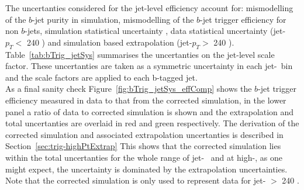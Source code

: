 The uncertanties considered for the jet-level efficiency account for:
mismodelling of the $b$-jet purity in simulation, mismodelling of the $b$-jet trigger efficiency for non $b$-jets,
simulation statistical uncertainty , data statistical uncertainty (jet-$p_T <$ 240 \GeV) and simulation based extrapolation (jet-$p_T >$ 240 \GeV).
Table~\ref{tab:bTrig_jetSys} summarises the uncertanties on the jet-level scale factor.
These uncertanties are taken as a symmetric uncertainty in each jet-\pT~bin and the scale factors are applied to each b-tagged jet.\\

As a final sanity check Figure~\ref{fig:bTrig_jetSys_effComp} shows the $b$-jet trigger efficiency measured in data to
that from the corrected simulation, in the lower panel a ratio of data to corrected simulation is shown
and the extrapolation and total uncertanties are overlaid in red and green respectively.
The derivation of the corrected simulation and associated extrapolation uncertanties is described in Section~\ref{sec:trig-highPtExtrap}
This shows that the corrected simulation lies within the total uncertanties for the whole range of jet-\pT~
and at high-\pT, as one might expect, the uncertainty is dominated by the extrapolation uncertainties.
Note that the corrected simulation is only used to represent data for jet-\pT{} $>$ 240 \GeV.

